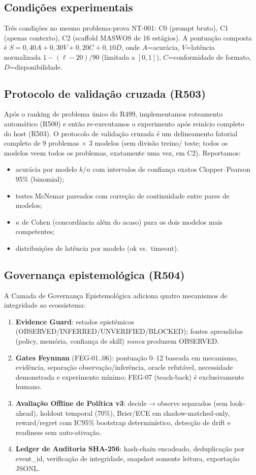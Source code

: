 \subsection{Condições experimentais}
\label{sec:conditions}
Três condições no mesmo problema-prova NT-001: C0 (prompt bruto), C1
(apenas contexto), C2 (scaffold MASWOS de 16 estágios). A pontuação
composta é $S = 0,40A + 0,30V + 0,20C + 0,10D$, onde $A$=acurácia,
$V$=latência normalizada $1-(\ell-20)/90$ (limitada a $[0,1]$),
$C$=conformidade de formato, $D$=disponibilidade.

\subsection{Protocolo de validação cruzada (R503)}
\label{sec:crossval}
Após o ranking de problema único do R499, implementamos roteamento
automático (R500) e então re-executamos o experimento após reinício
completo do host (R503). O protocolo de validação cruzada é um delineamento
fatorial completo de 9 problemas $\times$ 3 modelos (sem divisão treino/
teste; todos os modelos veem todos os problemas, exatamente uma vez, em C2).
Reportamos:
\begin{itemize}
  \item acurácia por modelo $k/n$ com intervalos de confiança exatos
  Clopper--Pearson 95\% (binomial);
  \item testes McNemar pareados com correção de continuidade entre pares de
  modelos;
  \item $\kappa$ de Cohen (concordância além do acaso) para os dois modelos
  mais competentes;
  \item distribuições de latência por modelo (ok vs.\ timeout).
\end{itemize}

\subsection{Governança epistemológica (R504)}
\label{sec:governance}
A Camada de Governança Epistemológica adiciona quatro mecanismos de
integridade ao ecossistema:
\begin{enumerate}
  \item \textbf{Evidence Guard}: estados epistêmicos
  (OBSERVED/INFERRED/UNVERIFIED/BLOCKED); fontes aprendidas (policy,
  memória, confiança de skill) \emph{nunca} produzem OBSERVED.
  \item \textbf{Gates Feynman} (FEG-01..06): pontuação 0--12 baseada em
  mecanismo, evidência, separação observação/inferência, oracle refutável,
  necessidade demonstrada e experimento mínimo; FEG-07 (teach-back) é
  exclusivamente humano.
  \item \textbf{Avaliação Offline de Política v3}: decide$\rightarrow$observe
  separados (sem look-ahead), holdout temporal (70\%), Brier/ECE em
  shadow-matched-only, reward/regret com IC95\% bootstrap determinístico,
  detecção de drift e readiness sem auto-ativação.
  \item \textbf{Ledger de Auditoria SHA-256}: hash-chain encadeado,
  deduplicação por event\_id, verificação de integridade, snapshot somente
  leitura, exportação JSONL.
\end{enumerate}

